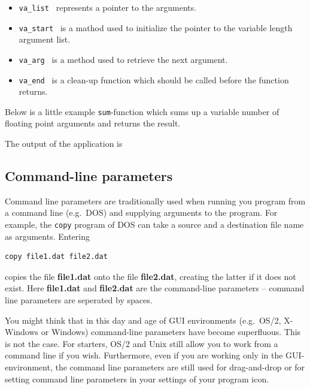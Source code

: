 \begin{itemize}
  \item \verb+va_list + represents a pointer to the arguments.
  \item \verb+va_start + is a mathod used to initialize the pointer to the
        variable length argument list.
  \item \verb+va_arg + is a method used to retrieve the next argument.
  \item \verb+va_end + is a clean-up function which should be called before the
        function returns.
\end{itemize} 

Below is a little example \verb+sum+-function which sums up a variable number
of floating point arguments and returns the result.

\noindent{\small}

The output of the application is



\subsection{Command-line parameters}

Command line parameters are traditionally used when running you program from a
command line (e.g.\ DOS) and supplying arguments to the program. For example,
the \verb+copy+ program of DOS can take a source and a destination file name
as arguments. Entering
{\small \begin{verbatim}
copy file1.dat file2.dat
\end{verbatim}}
copies the file {\bf file1.dat} onto the file {\bf file2.dat}, creating the latter if it does
not exist. Here {\bf file1.dat} and {\bf file2.dat} are the command-line parameters --
command line parameters are seperated by spaces.

You might think that in this day and age of GUI environments (e.g.\ OS/2, X-Windows or
Windows) command-line parameters have become superfluous. This is not the case.
For starters, OS/2 and Unix still allow you to work from a command line if you wish.
Furthermore, even if you are working only in the GUI-environment, the command line
parameters are still used for drag-and-drop or for setting command
line parameters in your settings of your program icon.

